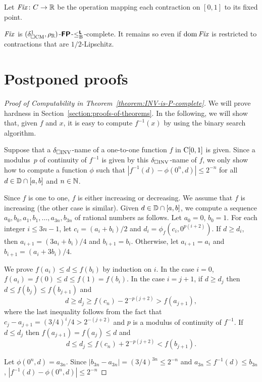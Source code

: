 \documentclass[envcountsame,orivec,oribibl]{llncs}
\begin{document}
Let $\mathit{Fix} \colon C \to \mathbb R$ be the operation 
mapping each contraction on $[0, 1]$ to its fixed point.

\begin{lemma}
\label{lemma:P-hard-g_u}
$\mathit{Fix}$ is $(\delta _{\square \mathrm{CM}}^1, \rho _\mathbb R)$-$\text{\bfseries \sffamily \upshape FP}$-$\leq _{\mathrm B} ^{\text{\bfseries \sffamily \upshape L}}$-complete. 
It remains so even if $\mathop{\rm dom} \mathit{Fix}$ is restricted to contractions 
that are $1/2$-Lipschitz.
\end{lemma}




\clearpage
\appendix
\section{Postponed proofs}

\begin{proof}[Proof of Computability in Theorem~\ref{theorem:INV-is-P-complete}]
We will prove hardness in Section~\ref{section:proofs-of-theorems}.
In the following, we will show that, 
given $f$ and $x$, 
it is easy to compute $f^{-1}(x)$ by using the binary search algorithm.

Suppose that a $\delta _{\square \mathrm{INV}}$-name of a one-to-one function $f$ in $\mathrm C [0, 1]$ is given. 
Since a modulus~$p$ of continuity of $f ^{-1}$ is given by this $\delta _{\square \mathrm{INV}}$-name of $f$,
we only show how to compute a function $\phi$ such that 
$|f^{-1}(d) - \phi(0^n, d)| \le 2^{-n}$ for all $d \in \mathbb D \cap [a, b]$ and $n \in \mathbb N$.

Since $f$ is one to one, $f$ is either increasing or decreasing. 
We assume that $f$ is increasing (the other case is similar).
Given $d \in \mathbb D \cap [a, b]$, 
we compute a sequence  $a_0, b_0, a_1,b_1, \dots, a_{3n}, b_{3n}$ of rational numbers as follows.
Let $a_0 = 0$, $b_0 = 1$.
For each integer $i \le 3n-1$,
let $c_i = (a_i+b_i)/2$ and $d_i = \phi_f(c_i, 0^{p(i+2)})$.
If $d \ge d_i$, then $a_{i+1} = (3a_i+b_i)/4$ and $b_{i+1} = b_i$. 
Otherwise, let $a_{i+1} = a_i$ and $b_{i+1} = (a_i+3b_i)/4$.

We prove $f(a_i) \leq d \leq f(b_i)$ by induction on $i$.
In the case $i = 0$, $f(a_i) = f(0) \le d \le f(1) = f(b_i)$.
In the case $i=j+1$, if $d \ge d_j$ then $d \le f(b_j) \le f(b_{j+1})$ and
\begin{equation}
 d \ge d_j \ge f(c_n) - 2^{-p(j+2)} > f(a_{j+1}),
\end{equation}
where the last inequality follows from the fact that $c_j - a_{j+1} = (3/4)^i/4 > 2^{-(j+2)}$ and $p$ is a modulus of continuity of $f^{-1}$.
If $d \le d_j$ then $f(a_{j+1}) = f(a_j) \le d$ and 
\begin{equation}
 d \le d_j \le f(c_n) + 2^{-p(j+2)} < f(b_{j+1}).
\end{equation}

Let $\phi(0^n, d) = a_{3n}$.
Since $|b_{3n} - a_{3n}| = (3/4)^{3n} \le 2^{-n}$ and
$a_{3n} \le f^{-1}(d) \le b_{3n}$,
$|f^{-1}(d) - \phi(0^n, d)| \le 2^{-n}$
\end{proof}
\end{document}
